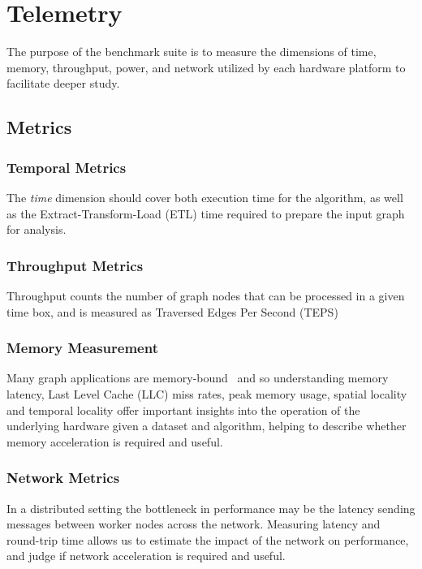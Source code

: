 \section{Telemetry}\label{section:telemetry}
    \par{
    The purpose of the benchmark suite is to measure the dimensions of time, memory, throughput, power, and network utilized by each hardware platform to facilitate deeper study. 
    } 

    \subsection{Metrics}
    \subsubsection{Temporal Metrics}
    The \textit{time} dimension should cover both execution time for the algorithm, as well as the Extract-Transform-Load (ETL) time required to prepare the input graph for analysis. 
    
    \subsubsection{Throughput Metrics}
    Throughput counts the number of graph nodes that can be processed in a given time box, and is measured as Traversed Edges Per Second (TEPS)

    \subsubsection{Memory Measurement}
    Many graph applications are memory-bound~\cite{Aananthakrishnan2020,Beamer2015} and so understanding memory latency, Last Level Cache (LLC) miss rates, peak memory usage, spatial locality and temporal locality offer important insights into the operation of the underlying hardware given a dataset and algorithm, helping to describe whether memory acceleration is required and useful.
    
    \subsubsection{Network Metrics}
    In a distributed setting the bottleneck in performance may be the latency sending messages between worker nodes across the network. 
    Measuring latency and round-trip time allows us to estimate the impact of the network on performance, and judge if network acceleration is required and useful. 

